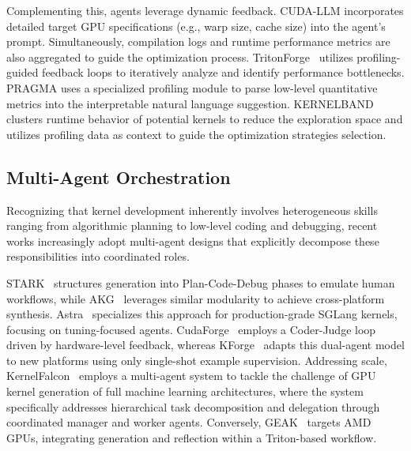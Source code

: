 Complementing this, agents leverage dynamic feedback. CUDA-LLM \cite{chen2025cuda} incorporates detailed target GPU specifications (e.g., warp size, cache size) into the agent's prompt. Simultaneously, compilation logs and runtime performance metrics are also aggregated to guide the optimization process. TritonForge~\cite{li2025tritonforge} utilizes profiling-guided feedback loops to iteratively analyze and identify performance bottlenecks. PRAGMA \cite{lei2025pragma} uses a specialized profiling module to parse low-level quantitative metrics into the interpretable natural language suggestion. KERNELBAND~\cite{ran2025kernelband} clusters runtime behavior of potential kernels to reduce the exploration space and utilizes profiling data  as context to guide the optimization strategies selection. 



\subsection{Multi-Agent Orchestration}


Recognizing that kernel development inherently involves heterogeneous skills ranging from algorithmic planning to low-level coding and debugging, recent works increasingly adopt multi-agent designs that explicitly decompose these responsibilities into coordinated roles.

STARK~\cite{dong2025stark} structures generation into Plan-Code-Debug phases to emulate human workflows, while AKG~\cite{du2025akgkernelagentmultiagent} leverages similar modularity to achieve cross-platform synthesis. Astra~\cite{wei2025astra} specializes this approach for production-grade SGLang kernels, focusing on tuning-focused agents. CudaForge~\cite{Zhang2025CudaForge} employs a Coder-Judge loop driven by hardware-level feedback, whereas KForge~\cite{sereda2025kforge} adapts this dual-agent model to new platforms using only single-shot example supervision. Addressing scale, KernelFalcon~\cite{kernelfalcon2024} employs a multi-agent system to tackle the challenge of GPU kernel generation of full machine learning architectures, where the system specifically addresses hierarchical task decomposition and delegation through coordinated manager and worker agents. Conversely, GEAK~\cite{Wang_2025_GEAK} targets AMD GPUs, integrating generation and reflection within a Triton-based workflow.

